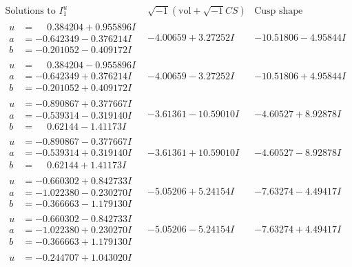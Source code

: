 \documentclass[1p]{elsarticle_modified}
\theoremstyle{definition}
\newcommand{\I}{\sqrt{-1}}
\begin{document}
$$\begin{array}{c|c|c}  
\text{Solutions to }I^u_{1}& \I (\text{vol} + \sqrt{-1}CS) & \text{Cusp shape}\\
 \hline 
\begin{aligned}
u &= \phantom{-}0.384204 + 0.955896 I \\
a &= -0.642349 - 0.376214 I \\
b &= -0.201052 - 0.409172 I\end{aligned}
 & -4.00659 + 3.27252 I & -10.51806 - 4.95844 I \\ \hline\begin{aligned}
u &= \phantom{-}0.384204 - 0.955896 I \\
a &= -0.642349 + 0.376214 I \\
b &= -0.201052 + 0.409172 I\end{aligned}
 & -4.00659 - 3.27252 I & -10.51806 + 4.95844 I \\ \hline\begin{aligned}
u &= -0.890867 + 0.377667 I \\
a &= -0.539314 - 0.319140 I \\
b &= \phantom{-}0.62144 - 1.41173 I\end{aligned}
 & -3.61361 - 10.59010 I & -4.60527 + 8.92878 I \\ \hline\begin{aligned}
u &= -0.890867 - 0.377667 I \\
a &= -0.539314 + 0.319140 I \\
b &= \phantom{-}0.62144 + 1.41173 I\end{aligned}
 & -3.61361 + 10.59010 I & -4.60527 - 8.92878 I \\ \hline\begin{aligned}
u &= -0.660302 + 0.842733 I \\
a &= -1.022380 - 0.230270 I \\
b &= -0.366663 - 1.179130 I\end{aligned}
 & -5.05206 + 5.24154 I & -7.63274 - 4.49417 I \\ \hline\begin{aligned}
u &= -0.660302 - 0.842733 I \\
a &= -1.022380 + 0.230270 I \\
b &= -0.366663 + 1.179130 I\end{aligned}
 & -5.05206 - 5.24154 I & -7.63274 + 4.49417 I \\ \hline\begin{aligned}
u &= -0.244707 + 1.043020 I \\

\end{aligned}
\end{array}$$
\end{document}
